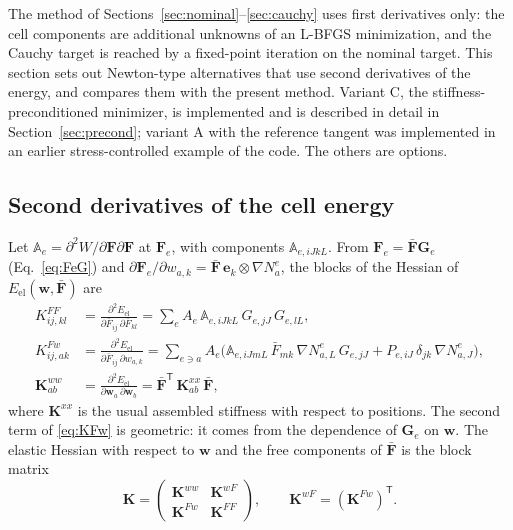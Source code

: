 \documentclass[11pt,a4paper]{article}
\newcommand{\Fb}{\bar{\mathbf F}}
\newcommand{\F}{\mathbf F}
\newcommand{\w}{\mathbf w}
\newcommand{\G}{\mathbf G}
\begin{document}
The method of Sections~\ref{sec:nominal}--\ref{sec:cauchy} uses first derivatives only: the cell
components are additional unknowns of an L-BFGS minimization, and the Cauchy target is reached by a
fixed-point iteration on the nominal target. This section sets out Newton-type alternatives that use
second derivatives of the energy, and compares them with the present method. Variant C, the
stiffness-preconditioned minimizer, is implemented and is described in detail in
Section~\ref{sec:precond}; variant A with the reference tangent was implemented in an earlier
stress-controlled example of the code. The others are options.

\subsection{Second derivatives of the cell energy}

Let \(\mathbb A_e=\partial^2W/\partial\F\partial\F\) at \(\F_e\), with components
\(\mathbb A_{e,iJkL}\). From \(\F_e=\Fb\G_e\) (Eq.~\eqref{eq:FeG}) and
\(\partial\F_e/\partial w_{a,k}=\Fb\,\mathbf e_k\otimes\nabla N^e_a\), the blocks of the Hessian of
\(E_{\mathrm{el}}(\w,\Fb)\) are
\begin{align}
  K^{FF}_{ij,kl}&=\frac{\partial^2E_{\mathrm{el}}}{\partial\bar F_{ij}\,\partial\bar F_{kl}}
   =\sum_e A_e\,\mathbb A_{e,iJkL}\,G_{e,jJ}\,G_{e,lL},
  \label{eq:KFF}\\
  K^{Fw}_{ij,ak}&=\frac{\partial^2E_{\mathrm{el}}}{\partial\bar F_{ij}\,\partial w_{a,k}}
   =\sum_{e\ni a}A_e\Big(\mathbb A_{e,iJmL}\,\bar F_{mk}\,\nabla N^e_{a,L}\,G_{e,jJ}
     +P_{e,iJ}\,\delta_{jk}\,\nabla N^e_{a,J}\Big),
  \label{eq:KFw}\\
  \mathbf K^{ww}_{ab}&=\frac{\partial^2E_{\mathrm{el}}}{\partial\w_a\,\partial\w_b}
   =\Fb^{\mathsf T}\,\mathbf K^{xx}_{ab}\,\Fb ,
  \label{eq:Kww}
\end{align}
where \(\mathbf K^{xx}\) is the usual assembled stiffness with respect to positions. The second
term of \eqref{eq:KFw} is geometric: it comes from the dependence of \(\G_e\) on \(\w\). The
elastic Hessian with respect to \(\w\) and the free components of \(\Fb\) is the block matrix
\begin{equation}
  \mathbf K=\begin{pmatrix}\mathbf K^{ww}&\mathbf K^{wF}\\ \mathbf K^{Fw}&\mathbf K^{FF}\end{pmatrix},
  \qquad \mathbf K^{wF}=(\mathbf K^{Fw})^{\mathsf T}.
  \label{eq:Kfull}
\end{equation}
\end{document}
